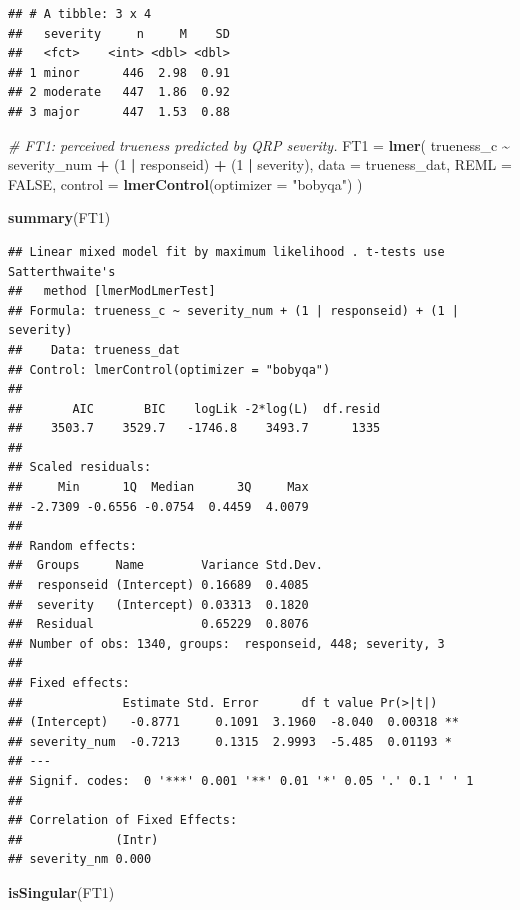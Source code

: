 \documentclass[
]{article}
\newenvironment{Shaded}{\begin{snugshade}}{\end{snugshade}}
\newcommand{\AttributeTok}[1]{\textcolor[rgb]{0.13,0.29,0.53}{#1}}
\newcommand{\CommentTok}[1]{\textcolor[rgb]{0.56,0.35,0.01}{\textit{#1}}}
\newcommand{\ConstantTok}[1]{\textcolor[rgb]{0.56,0.35,0.01}{#1}}
\newcommand{\DecValTok}[1]{\textcolor[rgb]{0.00,0.00,0.81}{#1}}
\newcommand{\FunctionTok}[1]{\textcolor[rgb]{0.13,0.29,0.53}{\textbf{#1}}}
\newcommand{\NormalTok}[1]{#1}
\newcommand{\OtherTok}[1]{\textcolor[rgb]{0.56,0.35,0.01}{#1}}
\newcommand{\SpecialCharTok}[1]{\textcolor[rgb]{0.81,0.36,0.00}{\textbf{#1}}}
\newcommand{\StringTok}[1]{\textcolor[rgb]{0.31,0.60,0.02}{#1}}
\begin{document}
\begin{verbatim}
## # A tibble: 3 x 4
##   severity     n     M    SD
##   <fct>    <int> <dbl> <dbl>
## 1 minor      446  2.98  0.91
## 2 moderate   447  1.86  0.92
## 3 major      447  1.53  0.88
\end{verbatim}

\begin{Shaded}
\begin{Highlighting}[]
\CommentTok{\# FT1: perceived trueness predicted by QRP severity.}
\NormalTok{FT1 }\OtherTok{=} \FunctionTok{lmer}\NormalTok{(}
\NormalTok{  trueness\_c }\SpecialCharTok{\textasciitilde{}}\NormalTok{ severity\_num }\SpecialCharTok{+}
\NormalTok{    (}\DecValTok{1} \SpecialCharTok{|}\NormalTok{ responseid) }\SpecialCharTok{+}
\NormalTok{    (}\DecValTok{1} \SpecialCharTok{|}\NormalTok{ severity),}
  \AttributeTok{data =}\NormalTok{ trueness\_dat,}
  \AttributeTok{REML =} \ConstantTok{FALSE}\NormalTok{,}
  \AttributeTok{control =} \FunctionTok{lmerControl}\NormalTok{(}\AttributeTok{optimizer =} \StringTok{"bobyqa"}\NormalTok{)}
\NormalTok{)}

\FunctionTok{summary}\NormalTok{(FT1)}
\end{Highlighting}
\end{Shaded}

\begin{verbatim}
## Linear mixed model fit by maximum likelihood . t-tests use Satterthwaite's
##   method [lmerModLmerTest]
## Formula: trueness_c ~ severity_num + (1 | responseid) + (1 | severity)
##    Data: trueness_dat
## Control: lmerControl(optimizer = "bobyqa")
## 
##       AIC       BIC    logLik -2*log(L)  df.resid 
##    3503.7    3529.7   -1746.8    3493.7      1335 
## 
## Scaled residuals: 
##     Min      1Q  Median      3Q     Max 
## -2.7309 -0.6556 -0.0754  0.4459  4.0079 
## 
## Random effects:
##  Groups     Name        Variance Std.Dev.
##  responseid (Intercept) 0.16689  0.4085  
##  severity   (Intercept) 0.03313  0.1820  
##  Residual               0.65229  0.8076  
## Number of obs: 1340, groups:  responseid, 448; severity, 3
## 
## Fixed effects:
##              Estimate Std. Error      df t value Pr(>|t|)   
## (Intercept)   -0.8771     0.1091  3.1960  -8.040  0.00318 **
## severity_num  -0.7213     0.1315  2.9993  -5.485  0.01193 * 
## ---
## Signif. codes:  0 '***' 0.001 '**' 0.01 '*' 0.05 '.' 0.1 ' ' 1
## 
## Correlation of Fixed Effects:
##             (Intr)
## severity_nm 0.000
\end{verbatim}

\begin{Shaded}
\begin{Highlighting}[]
\FunctionTok{isSingular}\NormalTok{(FT1)}
\end{Highlighting}
\end{Shaded}
\end{document}
